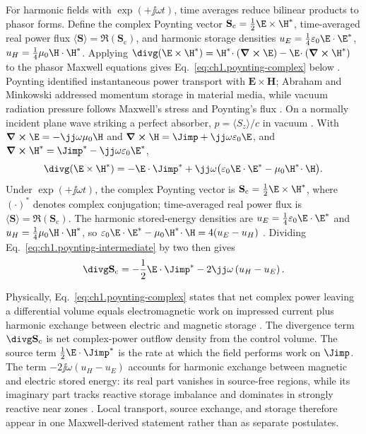 For harmonic fields with $\exp(+\jj\omega t)$, time averages reduce bilinear products to
phasor forms. Define the complex Poynting vector
$\mathbf{S}_\mathrm{c}=\tfrac12\E\times\H^*$, time-averaged real power flux
$\langle\mathbf{S}\rangle=\Re(\mathbf{S}_\mathrm{c})$, and harmonic storage densities
$u_E=\tfrac14\varepsilon_0\E\cdot\E^*$, $u_H=\tfrac14\mu_0\H\cdot\H^*$. Applying
$\divg(\E\times\H^*)=\H^*\!\cdot(\curl\E)-\E\!\cdot(\curl\H^*)$ to the phasor Maxwell
equations gives Eq.~\eqref{eq:ch1.poynting-complex} below \cite{stratton1941,harrington2001}.
Poynting \cite{poynting1884} identified instantaneous power transport with
$\mathbf{E}\times\mathbf{H}$; Abraham and Minkowski \cite{abraham1910,minkowski1908}
addressed momentum storage in material media, while vacuum radiation pressure follows
Maxwell's stress and Poynting's flux \cite{maxwell1873,stratton1941}. On a normally
incident plane wave striking a perfect absorber, $p=\langle S_z\rangle/c$ in vacuum
\cite{stratton1941}. With $\curl\E=-\jj\omega\mu_0\H$ and
$\curl\H=\Jimp+\jj\omega\varepsilon_0\E$, and $\curl\H^*=\Jimp^*-\jj\omega\varepsilon_0\E^*$,
\begin{equation}
\label{eq:ch1.poynting-intermediate}
\divg(\E\times\H^*)
=-\E\cdot\Jimp^*
+\jj\omega\bigl(\varepsilon_0\E\cdot\E^*-\mu_0\H^*\!\cdot\H\bigr).
\end{equation}
Under $\exp(+\jj\omega t)$, the complex Poynting vector is
\(\mathbf{S}_\mathrm{c}=\tfrac{1}{2}\E\times\H^*\), where \((\cdot)^*\) denotes complex
conjugation; time-averaged real power flux is
\(\langle\mathbf{S}\rangle=\Re(\mathbf{S}_\mathrm{c})\). The harmonic stored-energy
densities are
\(u_E=\tfrac{1}{4}\varepsilon_0\E\cdot\E^*\) and
\(u_H=\tfrac{1}{4}\mu_0\H\cdot\H^*\), so
$\varepsilon_0\E\cdot\E^*-\mu_0\H^*\!\cdot\H=4(u_E-u_H)$ \cite{stratton1941}.
Dividing Eq.~\eqref{eq:ch1.poynting-intermediate} by two then gives
\begin{equation}
\label{eq:ch1.poynting-average}\divg\mathbf{S}_\mathrm{c}
=-\frac{1}{2}\E\cdot\Jimp^*
-2\jj\omega\left(u_H-u_E\right).
\end{equation}
\addtocounter{equation}{-1}\label{eq:ch1.dual-invariant-poynting}%
\addtocounter{equation}{-1}\label{eq:ch1.poynting-complex}%
Physically, Eq.~\eqref{eq:ch1.poynting-complex} states that net complex power leaving a differential volume equals electromagnetic work on impressed current plus harmonic exchange between electric and magnetic storage \cite{poynting1884}. The divergence term $\divg\mathbf{S}_\mathrm{c}$ is net complex-power outflow density from the control volume. The source term $\tfrac{1}{2}\E\cdot\Jimp^*$ is the rate at which the field performs work on $\Jimp$. The term $-2\jj\omega(u_H-u_E)$ accounts for harmonic exchange between magnetic and electric stored energy: its real part vanishes in source-free regions, while its imaginary part tracks reactive storage imbalance and dominates in strongly reactive near zones \cite{stratton1941}. Local transport, source exchange, and storage therefore appear in one Maxwell-derived statement rather than as separate postulates.

